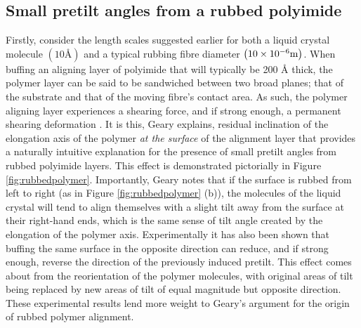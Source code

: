 \subsection{Small pretilt angles from a rubbed polyimide}
Firstly, consider the length scales suggested earlier for both a liquid crystal molecule $\left(10\text{\AA}\right)$ and a typical rubbing fibre diameter $\left(10\times10^{-6}\space\text{m}\right)$. When buffing an aligning layer of polyimide that will typically be 200 $\text{\AA}$ thick, the polymer layer can be said to be sandwiched between two broad planes; that of the substrate and that of the moving fibre's contact area. As such, the polymer aligning layer experiences a shearing force, and if strong enough, a permanent shearing deformation \cite{Geary1987}. It is this, Geary explains, residual inclination of the elongation axis of the polymer \textit{at the surface} of the alignment layer that provides a naturally intuitive explanation for the presence of small pretilt angles from rubbed polyimide layers. This effect is demonstrated pictorially in Figure \ref{fig:rubbedpolymer}. Importantly, Geary notes that if the surface is rubbed from left to right (as in Figure \ref{fig:rubbedpolymer} (b)), the molecules of the liquid crystal will tend to align themselves with a slight tilt away from the surface at their right-hand ends, which is the same sense of tilt angle created by the elongation of the polymer axis. Experimentally it has also been shown that buffing the same surface in the opposite direction can reduce, and if strong enough, reverse the direction of the previously induced pretilt. This effect comes about from the reorientation of the polymer molecules, with original areas of tilt being replaced by new areas of tilt of equal magnitude but opposite direction. These experimental results lend more weight to Geary's argument for the origin of rubbed polymer alignment.


